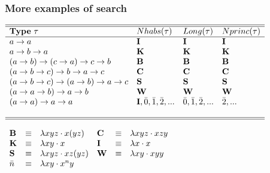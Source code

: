 \begin{frame}
\frametitle{More examples of search}



% 
% 



$
 \begin{array}{lllll}\hline\hline
 \mbox{\textbf{Type} } \tau             & Nhabs(\tau)         & Long(\tau)        & Nprinc(\tau)       \\\hline
  a\to a                                 & \mbox{\textbf{I}}   & \mbox{\textbf{I}} & \mbox{\textbf{I}} \\
  a\to b\to a                            & \mbox{\textbf{K}}   & \mbox{\textbf{K}} & \mbox{\textbf{K}} \\
 (a\to b)\to (c \to a) \to c \to b       & \mbox{\textbf{B}}   & \mbox{\textbf{B}} & \mbox{\textbf{B}} \\
 (a\to b\to c)\to b\to a\to c            & \mbox{\textbf{C}}   & \mbox{\textbf{C}} & \mbox{\textbf{C}} \\
 (a\to b\to c)\to (a\to b)\to a\to c     & \mbox{\textbf{S}}   & \mbox{\textbf{S}} & \mbox{\textbf{S}} \\
 (a\to a\to b)\to a\to b                 & \mbox{\textbf{W}}   & \mbox{\textbf{W}} & \mbox{\textbf{W}} \\
 (a\to a) \to a \to a                    & \mbox{\textbf{I}}, \bar{0}, \bar{1}, \bar{2}, ... & \bar{0}, \bar{1}, \bar{2}, ... &\bar{2}, ... \\

  \\\hline\hline
 \end{array}
$

\begin{center}
$
\begin{array}{lcllcl}
 \mbox{\textbf{B}} & \equiv & \lambda x y z \cdot x (y z) & \mbox{\textbf{C}} & \equiv &  \lambda x y z \cdot x z y \\
 \mbox{\textbf{K}} & \equiv & \lambda x y \cdot x &  \mbox{\textbf{I}} & \equiv & \lambda x \cdot x \\
 \mbox{\textbf{S}} & \equiv & \lambda x y z \cdot x z (y z) &  \mbox{\textbf{W}} & \equiv & \lambda x y \cdot x y y \\
 \bar{n} & \equiv & \lambda x y\cdot x^n y
\end{array}
$
\end{center}

\end{frame}

